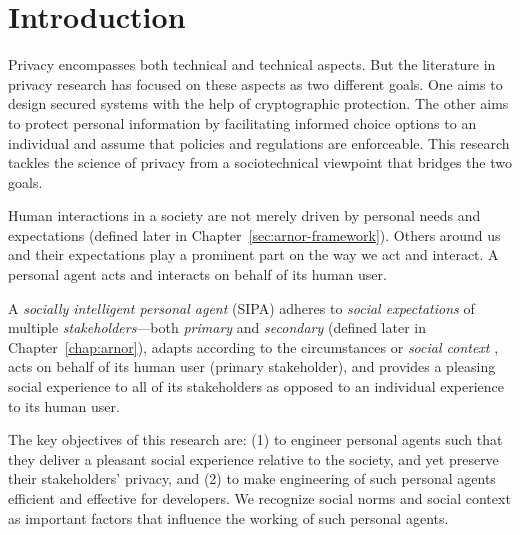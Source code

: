 \chapter{Introduction}
\label{chap:intro}

Privacy encompasses both technical and technical aspects. But the
literature in privacy research has focused on these aspects as two
different goals.  One aims to design secured systems with the help of
cryptographic protection. The other aims to protect personal information
by facilitating informed choice options to an individual and assume that
policies and regulations are enforceable. This research tackles
the science of privacy from a sociotechnical viewpoint that bridges the 
two goals.

Human interactions in a society are not merely driven by personal needs
and expectations (defined later in Chapter~\ref{sec:arnor-framework}). 
Others around us and their expectations play a
prominent part on the way we act and interact. A personal agent acts and
interacts on behalf of its human user. 

A \emph{socially intelligent personal agent} (SIPA) adheres to
\emph{social expectations} of multiple \emph{stakeholders}---both
\emph{primary} and \emph{secondary} (defined later in
Chapter~\ref{chap:arnor}), adapts according to the circumstances or
\emph{social context} \citep{Dey-2001-Context}, acts on behalf of its
human user (primary stakeholder), and provides a pleasing social
experience to all of its stakeholders as opposed to an individual
experience to its human user.


The key objectives of this research are: (1) to engineer personal agents
such that they deliver a pleasant social experience relative to the
society, and yet preserve their stakeholders' privacy, and (2) to make
engineering of such personal agents efficient and effective for
developers. We recognize social norms and social context as important
factors that influence the working of such personal agents.



